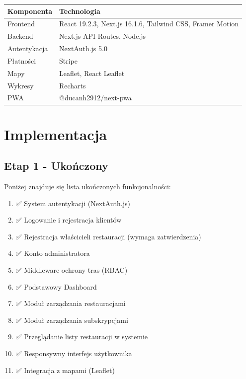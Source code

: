 \documentclass[12pt,a4paper,utf-8]{article}
\begin{document}
\begin{tabularx}{\textwidth}{|l|X|}
    \hline
    \textbf{Komponenta} & \textbf{Technologia} \\
    \hline
    Frontend & React 19.2.3, Next.js 16.1.6, Tailwind CSS, Framer Motion \\
    \hline
    Backend & Next.js API Routes, Node.js \\
    \hline
    Autentykacja & NextAuth.js 5.0 \\
    \hline
    Płatności & Stripe \\
    \hline
    Mapy & Leaflet, React Leaflet \\
    \hline
    Wykresy & Recharts \\
    \hline
    PWA & @ducanh2912/next-pwa \\
    \hline
\end{tabularx}

\newpage

\section{Implementacja}

\subsection{Etap 1 - Ukończony}

Poniżej znajduje się lista ukończonych funkcjonalności:

\begin{enumerate}
    \item ✅ System autentykacji (NextAuth.js)
    \item ✅ Logowanie i rejestracja klientów
    \item ✅ Rejestracja właścicieli restauracji (wymaga zatwierdzenia)
    \item ✅ Konto administratora
    \item ✅ Middleware ochrony tras (RBAC)
    \item ✅ Podstawowy Dashboard
    \item ✅ Moduł zarządzania restauracjami
    \item ✅ Moduł zarządzania subskrypcjami
    \item ✅ Przeglądanie listy restauracji w systemie
    \item ✅ Responsywny interfejs użytkownika
    \item ✅ Integracja z mapami (Leaflet)


\end{enumerate}
\end{document}
